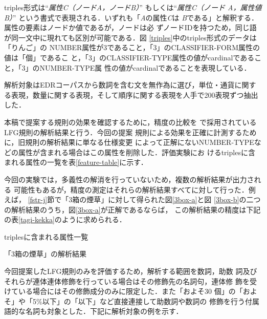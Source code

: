 \documentclass[japanese]{jnlp_1.4}
\begin{document}
triples形式は``{\it 属性C（ノードA，ノードB）}'' もしくは``{\it 属性C（ノード
A，属性値B）}'' という書式で表現される．いずれも「{\it A}の属性{\it C}は
{\it B}である」と解釈する．属性の要素はノードか値であるが，ノードは必
ずノードIDを持つため，同じ語が同一文中に現れても区別が可能である．図
\ref{triples}中のtriples形式のデータは「りんご」の
NUMBER属性が3であること，「3」のCLASSIFIER-FORM属性の値は「個」であるこ
と，「3」のCLASSIFIER-TYPE属性の値がcardinalであること，「3」のNUMBER-TYPE属
性の値がcardinalであることを表現している．

解析対象はEDRコーパスから数詞を含む文を無作為に選び，単位・通貨に関す
る表現，数量に関する表現，そして順序に関する表現を人手で200表現ずつ抽出
した．

本稿で提案する規則の効果を確認するために，精度の比較を
\cite{Masuichi2003}で採用されているLFG規則の解析結果と行う．今回の提案
規則による効果を正確に計測するために，旧規則の解析結果に単なる仕様変更
によって正解にないNUMBER-TYPEなどの属性が含まれる場合はこの属性を削除した．評価実験にお
けるtriplesに含まれる属性の一覧を表\ref{feature-table}に示す．

今回の実験では，多義性の解消を行っていないため，複数の解析結果が出力される
可能性もあるが，精度の測定はそれらの解析結果すべてに対して行った．例えば，
\ref{fstr-j}節で「3箱の煙草」に対して得られた図\ref{3box-a}と図
\ref{3box-b}の二つの解析結果のうち，図\ref{3box-a}が正解であるならば，
この解析結果の精度は下記の表\ref{tagi-kekka}のように求められる．

\begin{table}[t]
\caption{triplesに含まれる属性一覧}
\label{feature-table}

\end{table}
\begin{table}[t]
\caption{「3箱の煙草」の解析結果}
\label{tagi-kekka}

\end{table}

今回提案したLFG規則のみを評価するため，解析する範囲を数詞，助数
詞及びそれらが連体連体修飾を行っている場合はその修飾先の名詞句，連体修
飾を受けている場合にはその修飾成分のみに限定した．また「およそ30
個」の「およそ」や「5\%以下」の「以下」など直接連接して助数詞や数詞の
修飾を行う付属語的な名詞も対象とした．下記に解析対象の例を示す．
\end{document}
